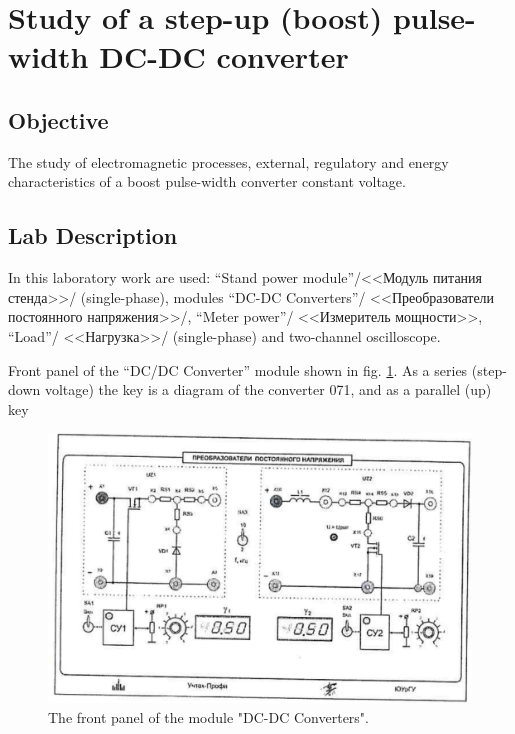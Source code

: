 \documentclass[a4paper,14pt]{article}
\begin{document}

\section{Study of a step-up (boost) pulse-width DC-DC converter}

\subsection{Objective}

The study of electromagnetic processes, external, regulatory and energy characteristics of a boost pulse-width converter constant voltage.


\subsection{Lab Description}

In this laboratory work are used: ``Stand power module''/<<Модуль питания стенда>>/ (single-phase), modules ``DC-DC Converters''/ <<Преобразователи постоянного напряжения>>/, ``Meter power''/ <<Измеритель мощности>>, ``Load''/ <<Нагрузка>>/ (single-phase) and two-channel oscilloscope.

Front panel of the ``DC/DC Converter'' module shown in fig. \ref{ris1}. As a series (step-down voltage) the key is a diagram of the converter 071, and as a parallel (up) key


\begin{figure}[!ht]
\includegraphics[scale=0.35]{img_60}
	\caption{The front panel of the module "DC-DC Converters".}
	\label{ris1}
\end{figure}
\end{document}
